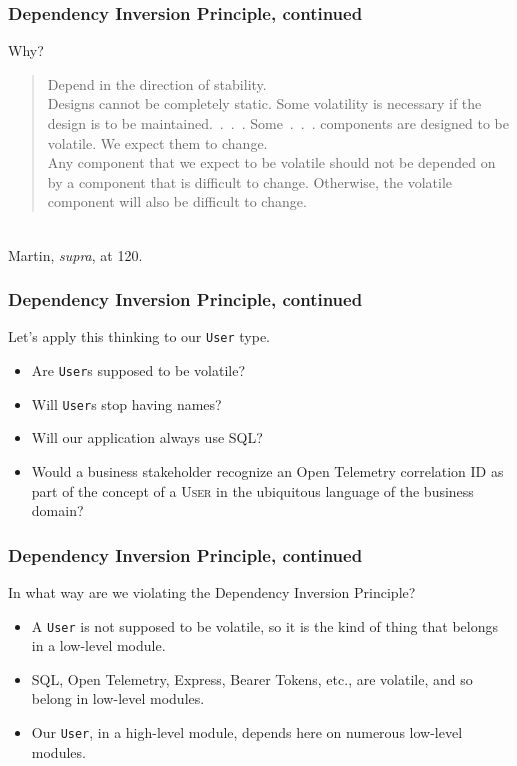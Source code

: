 \documentclass[aspectratio=169]{beamer}
\begin{document}
\begin{frame}
  \frametitle{Dependency Inversion Principle, continued}
  Why?
  \vspace{1em}
  \\
  \begin{quote}
    Depend in the direction of stability. \\

    Designs cannot be completely static. Some volatility is necessary if the
    design is to be maintained.~.~.~. Some~.~.~. components are designed to be
    volatile.  We expect them to change. \\

    Any component that we expect to be volatile should not be depended on by a
    component that is difficult to change.  Otherwise, the volatile component
    will also be difficult to change.
  \end{quote}\\
  \vspace{1em}
  Martin, \textit{supra}, at 120.
\end{frame}

\begin{frame}
  \frametitle{Dependency Inversion Principle, continued}
  Let's apply this thinking to our \texttt{User} type.

  \begin{itemize}
    \item Are \texttt{User}s supposed to be volatile?
    \item Will \texttt{User}s stop having names?
    \item Will our application always use SQL?
    \item Would a business stakeholder recognize an Open Telemetry correlation
          ID as part of the concept of a \textsc{User} in the ubiquitous
          language of the business domain?
  \end{itemize}
\end{frame}

\begin{frame}
  \frametitle{Dependency Inversion Principle, continued}
  In what way are we violating the Dependency Inversion Principle?
  \begin{itemize}
    \item A \texttt{User} is not supposed to be volatile, so it is the kind of
          thing that belongs in a low-level module.
    \item SQL, Open Telemetry, Express, Bearer Tokens, etc., are volatile,
          and so belong in low-level modules.
    \item Our \texttt{User}, in a high-level module, depends here on numerous
          low-level modules.
  \end{itemize}
\end{frame}
\end{document}
